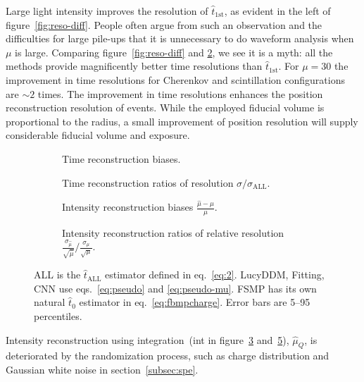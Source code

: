 Large light intensity improves the resolution of $\hat{t}_\mathrm{1st}$, as evident in the left of figure~\ref{fig:reso-diff}.  People often argue from such an observation and the difficulties for large pile-ups that it is unnecessary to do waveform analysis when $\mu$ is large.  Comparing figure~\ref{fig:reso-diff} and \ref{fig:deltamethods}, we see it is a myth: all the methods provide magnificently better time resolutions than $\hat{t}_\mathrm{1st}$. For $\mu=30$ the improvement in time resolutions for Cherenkov and scintillation configurations are $\sim 2$ times. The improvement in time resolutions enhances the position reconstruction resolution of events. While the employed fiducial volume is proportional to the radius, a small improvement of position resolution will supply considerable fiducial volume and exposure. 

\begin{figure}[H]
  \begin{subfigure}[b]{\textwidth}
    \centering
    \resizebox{\textwidth}{!}{}
    \caption{\label{fig:biasmethods} Time reconstruction biases.}
  \end{subfigure}
  \begin{subfigure}[b]{\textwidth}
    \centering
    \resizebox{\textwidth}{!}{}
    \caption{\label{fig:deltamethods} Time reconstruction ratios of resolution $\sigma/\sigma_{\mathrm{ALL}}$.}
  \end{subfigure}
  \begin{subfigure}[b]{\textwidth}
    \centering
    \resizebox{\textwidth}{!}{}
    \caption{\label{fig:biasmu} Intensity reconstruction biases $\frac{\hat{\mu} - \mu}{\mu}$.}
  \end{subfigure}
  \begin{subfigure}[b]{\textwidth}
    \centering
    \resizebox{\textwidth}{!}{}
    \caption{\label{fig:deltamu} Intensity reconstruction ratios of relative resolution $\frac{\sigma_{\hat{\mu}}}{\sqrt{\hat{\mu}}}/\frac{\sigma_\mu}{\sqrt{\mu}}$. }
  \end{subfigure}
  \caption{ALL is the $\hat{t}_\mathrm{ALL}$ estimator defined in eq.~\eqref{eq:2}. LucyDDM, Fitting, CNN use eqs.~\eqref{eq:pseudo} and \eqref{eq:pseudo-mu}.  FSMP has its own natural $\hat{t}_0$ estimator in eq.~\eqref{eq:fbmpcharge}. Error bars are 5--95 percentiles.}
\end{figure}

Intensity reconstruction using integration~(int in figure~\ref{fig:biasmu} and~\ref{fig:deltamu}), $\hat{\mu}_Q$, is deteriorated by the randomization process, such as charge distribution and Gaussian white noise in section~\ref{subsec:spe}. 


